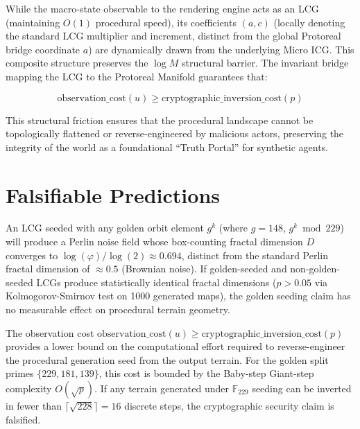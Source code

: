 While the macro-state observable to the rendering engine acts as an LCG (maintaining $O(1)$ procedural speed), its coefficients $(a, c)$ (locally denoting the standard LCG multiplier and increment, distinct from the global Protoreal bridge coordinate $a$) are dynamically drawn from the underlying Micro ICG. This composite structure preserves the $\log M$ structural barrier. The invariant bridge mapping the LCG to the Protoreal Manifold guarantees that:

\[
\text{observation\_cost}(u) \ge \text{cryptographic\_inversion\_cost}(p)
\]

This structural friction ensures that the procedural landscape cannot be topologically flattened or reverse-engineered by malicious actors, preserving the integrity of the world as a foundational ``Truth Portal'' for synthetic agents.

\section{Falsifiable Predictions}

\begin{hypothesis}\label{hyp:golden_fractal}
An LCG seeded with any golden orbit element $g^k$ (where $g = 148$, $g^k \bmod 229$) will produce a Perlin noise field whose box-counting fractal dimension $D$ converges to $\log(\varphi)/\log(2) \approx 0.694$, distinct from the standard Perlin fractal dimension of $\approx 0.5$ (Brownian noise). If golden-seeded and non-golden-seeded LCGs produce statistically identical fractal dimensions ($p > 0.05$ via Kolmogorov-Smirnov test on 1000 generated maps), the golden seeding claim has no measurable effect on procedural terrain geometry.
\end{hypothesis}

\begin{hypothesis}\label{hyp:inversion_cost}
The observation cost $\mathrm{observation\_cost}(u) \geq \mathrm{cryptographic\_inversion\_cost}(p)$ provides a lower bound on the computational effort required to reverse-engineer the procedural generation seed from the output terrain. For the golden split primes $\{229, 181, 139\}$, this cost is bounded by the Baby-step Giant-step complexity $O(\sqrt{p})$. If any terrain generated under $\mathbb{F}_{229}$ seeding can be inverted in fewer than $\lceil\sqrt{228}\rceil = 16$ discrete steps, the cryptographic security claim is falsified.
\end{hypothesis}

